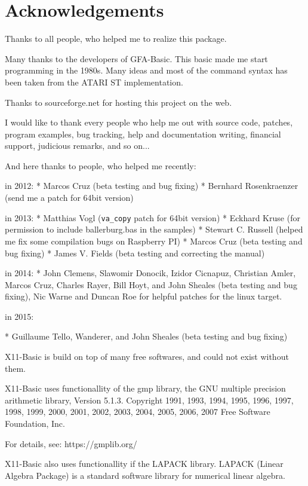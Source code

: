 
\chapter*{Acknowledgements}

Thanks to all people, who helped me to realize this package.

Many  thanks  to  the developers of GFA-Basic. This basic made me
start programming in the 1980s. Many ideas and most of  the  command 
syntax has been taken from the ATARI ST implementation.

Thanks to sourceforge.net for hosting this project on the web.

I would like to thank every people who help me out with source code, 
patches, program examples, bug tracking, help and documentation writing, 
financial support, judicious remarks, and so on...   

And here thanks to people, who helped me recently:

in 2012:
* Marcos Cruz (beta testing and bug fixing)
* Bernhard Rosenkraenzer (send me a patch for 64bit version)

in 2013:
* Matthias Vogl (\verb|va_copy| patch for 64bit version)
* Eckhard Kruse (for permission to include ballerburg.bas in the samples)
* Stewart C. Russell (helped me fix some compilation bugs on Raspberry PI)
* Marcos Cruz (beta testing and bug fixing)
* James V. Fields (beta testing and correcting the manual)

in 2014:
* John Clemens, Slawomir Donocik, Izidor Cicnapuz, Christian Amler,
  Marcos Cruz, Charles Rayer, Bill Hoyt, and John Sheales (beta testing and 
  bug fixing),
  Nic Warne and Duncan Roe for helpful patches for the linux target.

in 2015:

* Guillaume Tello, Wanderer, and John Sheales  (beta testing and bug fixing)

X11-Basic is build on top of many free softwares, and could not exist without 
them.

X11-Basic uses functionallity of the gmp library, 
the GNU multiple precision arithmetic library, Version 5.1.3.
   Copyright 1991, 1993, 1994, 1995, 1996, 1997, 1998, 1999, 2000,
2001, 2002, 2003, 2004, 2005, 2006, 2007 Free Software Foundation, Inc.

For details, see: https://gmplib.org/

X11-Basic also uses functionallity if the LAPACK library. 
LAPACK (Linear Algebra Package) is a standard software library for 
numerical linear algebra. 

